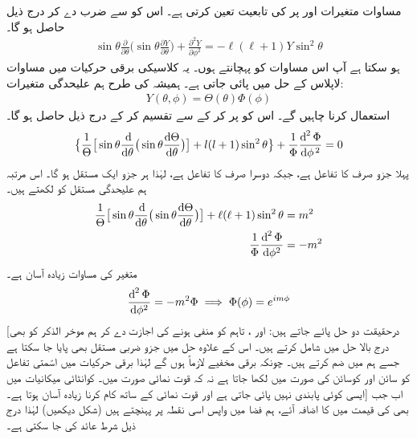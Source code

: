مساوات  متغیرات     اور      پر   کی تابعیت  تعین کرتی ہے۔
اس کو     سے ضرب دے کر درج ذیل حاصل ہو گا۔
\begin{align}\label{مساوات_ابعادی_زاویائی_مساوات}
\sin{\theta}\frac{\partial}{\partial{\theta}}\big(\sin{\theta}\frac{\partial{Y}}{\partial{\theta}}\big)+\frac{\partial^{2}{Y}}{\partial{\phi^{2}}}=-\ell(\ell+1)Y\sin^{2}{\theta} 
\end{align}
ہو سکتا ہے آپ اس مساوات کو پہچانتے ہوں۔ یہ کلاسیکی برقی حرکیات میں مساوات لاپلاس کے حل میں پائی جاتی ہے۔ ہمیشہ کی طرح ہم علیحدگی متغیرات:
\begin{align}
Y(\theta,\phi)=\Theta(\theta)\Phi(\phi) 
\end{align}
استعمال کرنا  چاہیں گے۔ اس کو پر کر کے  سے تقسیم کر کے درج ذیل حاصل ہو گا۔ 
\begin{align*}
\big\{\frac{1}{\Theta}\big[\sin{\theta}\frac{\dif}{\dif\theta}\big(\sin\theta\frac{\dif{\Theta}}{\dif{\theta}}\big)\big]+l(l+1)\sin^{2}{\theta}\big\}+\frac{1}{\Phi}\frac{\dif^{\,2}{\Phi}}{\dif{\phi^{\,2}}}=0 
\end{align*}
پہلا جزو صرف     کا تفاعل ہے، جبکہ دوسرا صرف        کا تفاعل ہے، لہٰذا ہر  جزو ایک مستقل ہو گا۔ اس مرتبہ ہم علیحدگی مستقل کو     لکھتے ہیں۔
\begin{align}
\frac{1}{\Theta}\big[\sin{\theta}\frac{\dif}{\dif\theta}\big(\sin\theta\frac{\dif{\Theta}}{\dif{\theta}}\big)\big]+\ell(\ell+1)\sin^{2}{\theta}&=m^{2} \\
\frac{1}{\Phi}\frac{\dif^{\,2}{\Phi}}{\dif{\phi^{2}}}&=-m^{2}\label{مساوات_تین_ابعادی_ایم}
\end{align}
 متغیر   کی مساوات زیادہ آسان ہے۔
 \begin{align}
\frac{\dif^{\,2}{\Phi}}{\dif{\phi^{2}}}=-m^{2}\Phi\implies \Phi(\phi)=e^{im\phi} 
\end{align}
[درحقیقت  دو حل پائے جاتے ہیں:  اور ، تاہم  کو منفی ہونے کی اجازت دے کر ہم موخر الذکر کو بھی درج بالا حل میں شامل کرتے ہیں۔ اس کے علاوہ حل میں  جزو ضربی مستقل بھی پایا جا  سکتا ہے جسے ہم     میں ضم کرتے ہیں۔ چونکہ برقی مخفیے   لازماً  ہوں  گے   لہٰذا برقی حرکیات میں اسّمتی تفاعل     کو  سائن اور کوسائن کی صورت میں لکھا جاتا ہے  نہ کہ قوت نمائی صورت میں۔ کوانٹائی میکانیات میں ایسی کوئی پابندی نہیں پائی جاتی ہے اور قوت نمائی کے ساتھ کام کرنا زیادہ آسان ہوتا ہے۔] اب جب بھی     کی قیمت  میں   کا اضافہ آئے،  ہم فضا میں واپس اسی نقطہ پر پہنچتے ہیں (شکل   دیکھیں) لہٰذا درج ذیل شرط عائد  کی جا سکتی ہے۔
